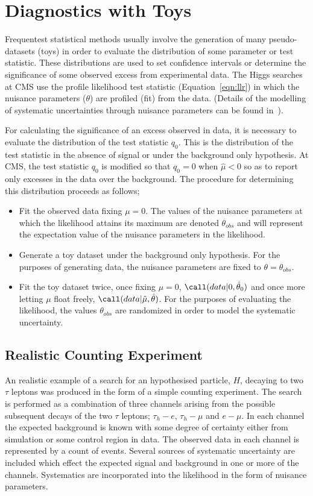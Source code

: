 \section{Diagnostics with Toys}
\label{sec:toys}

Frequentest statistical methods usually involve the generation of many pseudo-datasets (toys) in order to 
evaluate the distribution of some parameter or test statistic. These distributions are used to set
confidence intervals or determine the significance of some observed excess from experimental data.
The Higgs searches at CMS use the profile likelihood test statistic (Equation~\ref{eqn:llr}) in which
the nuisance parameters (${\theta}$) are profiled (fit) from the data. (Details of the modelling 
of systematic uncertainties through nuisance parameters can be found in~\cite{CMS-11-032}).

For calculating the significance of an excess observed in data, it is necessary to evaluate the distribution 
of the test statistic $q_{0}$. This is the distribution of the test statistic in the absence of signal or under the
background only hypothesis. At CMS, the test statistic $q_{0}$ is modified so that $q_{0}=0$ when $\hat{\mu}<0$ so as
to report only excesses in the data over the background. The procedure for determining this distribution proceeds as follows;

\begin{itemize}
\item{Fit the observed data fixing $\mu=0$. The values of the nuisance parameters 
at which the likelihood attains its maximum are denoted $\theta_{obs}$ and will represent the expectation value of the nuisance
parameters in the likelihood.}
\item{Generate a toy dataset under the background only hypothesis. For the purposes of
generating data, the nuisance parameters are fixed to $\theta=\theta_{obs}$.}
\item{Fit the toy dataset twice, once fixing $\mu=0$, $\call(data|0,\hat{\theta}_{0})$ and once more letting 
$\mu$ float freely, $\call(data|\hat{\mu},\hat{\theta})$. For the purposes of 
evaluating the likelihood, the values $\theta_{obs}$ are randomized in order to model the systematic uncertainty.}
\end{itemize}

\subsection{Realistic Counting Experiment}
An realistic example of a search for an hypothesised particle, $H$, decaying to two $\tau$ leptons was produced in the form 
of a simple counting experiment. The search is performed as a combination of three channels arising from the possible subsequent 
decays of the two $\tau$ leptons; $\tau_{h}-e$, $\tau_{h}-\mu$ and $e-\mu$. In each channel the expected background is known with
some degree of certainty either from simulation or some control region in data. The observed data in each channel is represented 
by a count of events. 
Several sources of systematic uncertainty are included which effect the expected signal and background in one or more of the channels. 
Systematics are incorporated into the likelihood in the form of nuisance parameters.

